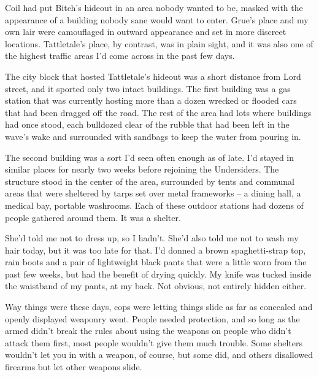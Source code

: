 





Coil had put Bitch's hideout in an area nobody wanted to be, masked with the appearance of a building nobody sane would want to enter.  Grue's place and my own lair were camouflaged in outward appearance and set in more discreet locations.  Tattletale's place, by contrast, was in plain sight, and it was also one of the highest traffic areas I'd come across in the past few days.



The city block that hosted Tattletale's hideout was a short distance from Lord street, and it sported only two intact buildings.  The first building was a gas station that was currently hosting more than a dozen wrecked or flooded cars that had been dragged off the road.   The rest of the area had lots where buildings had once stood, each bulldozed clear of the rubble that had been left in the wave's wake and surrounded with sandbags to keep the water from pouring in.



The second building was a sort I'd seen often enough as of late.  I'd stayed in similar places for nearly two weeks before rejoining the Undersiders.  The structure stood in the center of the area, surrounded by tents and communal areas that were sheltered by tarps set over metal frameworks – a dining hall, a medical bay, portable washrooms.  Each of these outdoor stations had dozens of people gathered around them.  It was a shelter.



She'd told me not to dress up, so I hadn't.  She'd also told me not to wash my hair today, but it was too late for that.  I'd donned a brown spaghetti-strap top, rain boots and a pair of lightweight black pants that were a little worn from the past few weeks, but had the benefit of drying quickly.  My knife was tucked inside the waistband of my pants, at my back.  Not obvious, not entirely hidden either.



Way things were these days, cops were letting things slide as far as concealed and openly displayed weaponry went.  People needed protection, and so long as the armed didn't break the rules about using the weapons on people who didn't attack them first, most people wouldn't give them much trouble.  Some shelters wouldn't let you in with a weapon, of course, but some did, and others disallowed firearms but let other weapons slide.



